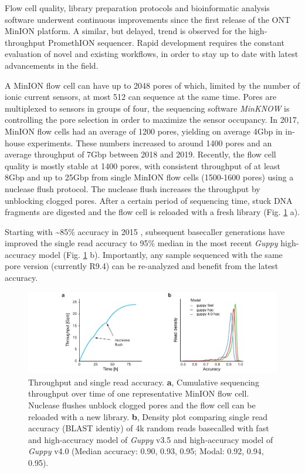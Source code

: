 Flow cell quality, library preparation protocols and bioinformatic analysis software underwent continuous improvements since the first release of the ONT MinION platform.
A similar, but delayed, trend is observed for the high-throughput PromethION sequencer.
Rapid development requires the constant evaluation of novel and existing workflows, in order to stay up to date with latest advancements in the field.

A MinION flow cell can have up to 2048 pores of which, limited by the number of ionic current sensors, at most 512 can sequence at the same time.
Pores are multiplexed to sensors in groups of four, the sequencing software \textit{MinKNOW} is controlling the pore selection in order to maximize the sensor occupancy.
In 2017, MinION flow cells had an average of 1200 pores, yielding on average 4Gbp in in-house experiments.
These numbers increased to around 1400 pores and an average throughput of 7Gbp between 2018 and 2019.
Recently, the flow cell quality is mostly stable at 1400 pores, with consistent throughput of at least 8Gbp and up to 25Gbp from single MinION flow cells (1500-1600 pores) using a nuclease flush protocol.
The nuclease flush increases the throughput by unblocking clogged pores. 
After a certain period of sequencing time, stuck DNA fragments are digested and the flow cell is reloaded with a fresh library (Fig. \ref{fig:state_of_art:throughput} a).

Starting with \textasciitilde85\% accuracy in 2015 \cite{Jain2015}, subsequent basecaller generations have improved the single read accuracy to 95\% median in the most recent \textit{Guppy} high-accuracy model (Fig. \ref{fig:state_of_art:throughput} b).
Importantly, any sample sequenced with the same pore version (currently R9.4) can be re-analyzed and benefit from the latest accuracy.

\begin{figure}[h]
    \centering
    \includegraphics[width=1.0\textwidth]{figures/state_of_art/throughput.pdf}
    \captionsetup{format=plain}
    \caption[Throughput and accuracy]{Throughput and single read accuracy. \textbf{a}, Cumulative sequencing throughput over time of one representative MinION flow cell. Nuclease flushes unblock clogged pores and the flow cell can be reloaded with a new library. \textbf{b}, Density plot comparing single read accuracy (BLAST identiy) of 4k random reads basecalled with fast and high-accuracy model of \textit{Guppy} v3.5 and high-accuracy model of \textit{Guppy} v4.0 (Median accuracy: 0.90, 0.93, 0.95; Modal: 0.92, 0.94, 0.95).}
    \label{fig:state_of_art:throughput}
\end{figure}


